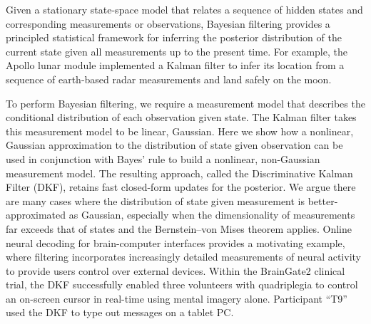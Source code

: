 


Given a stationary state-space model that relates a sequence of hidden states and corresponding measurements or observations, Bayesian filtering provides a principled statistical framework for inferring the posterior distribution of the current state given all measurements up to the present time.  For example, the Apollo lunar module implemented a Kalman filter to infer its location from a sequence of earth-based radar measurements and land safely on the moon.  

To perform Bayesian filtering, we require a measurement model that describes the conditional distribution of each observation given state.  The Kalman filter takes this measurement model to be linear, Gaussian.  Here we show how a nonlinear, Gaussian approximation to the distribution of state given observation can be used in conjunction with Bayes' rule to build a nonlinear, non-Gaussian measurement model.  The resulting approach, called the Discriminative Kalman Filter (DKF), retains fast closed-form updates for the posterior.  We argue there are many cases where the distribution of state given measurement is better-approximated as Gaussian, especially when the dimensionality of measurements far exceeds that of states and the Bernstein--von Mises theorem applies. Online neural decoding for brain-computer interfaces provides a motivating example, where filtering incorporates increasingly detailed measurements of neural activity to provide users control over external devices.  Within the BrainGate2 clinical trial, the DKF successfully enabled three volunteers with quadriplegia to control an on-screen cursor in real-time using mental imagery alone.  Participant ``T9'' used the DKF to type out messages on a tablet PC.

